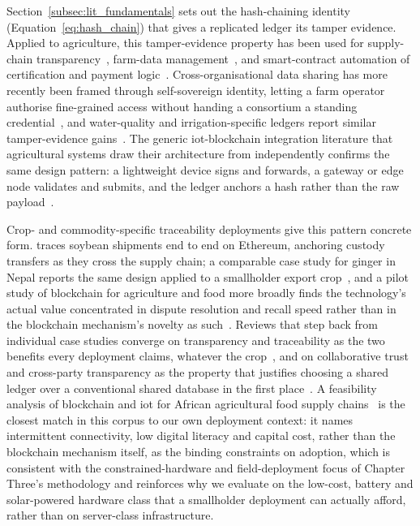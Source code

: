 \documentclass[12pt,a4paper,oneside]{book}
\begin{document}
Section~\ref{subsec:lit_fundamentals} sets out the hash-chaining identity
(Equation~\ref{eq:hash_chain}) that gives a replicated ledger its tamper
evidence. Applied to agriculture, this tamper-evidence property has been
used for supply-chain
transparency~\cite{tian2016agri, kamilaris2019rise, oh2025foodsafety, galvez2018future, tian2017traceability, reyna2018blockchain, tian2017agri, anonndsupplychain}, farm-data
management~\cite{lin2018blockchain, ferrag2020security, haque2024scalable, zhang2019blockchain, ali2023farmDataTampering}, and smart-contract
automation of certification and payment
logic~\cite{rama2021systematic, patil2022blockchain, nguyen2022smartFarmingSC, tian2017agri}. Cross-organisational data
sharing has more recently been framed through self-sovereign identity,
letting a farm operator authorise fine-grained access without handing a
consortium a standing credential~\cite{amraouy2025ssi}, and water-quality
and irrigation-specific ledgers report similar tamper-evidence
gains~\cite{saito2025blockchainWaterQuality, arshad2022blockchainBenefits, ali2023farmDataTampering, rahman2019agriSecurity}. The generic \gls{iot}-blockchain integration
literature that agricultural systems draw their architecture from
independently confirms the same design pattern: a lightweight device signs
and forwards, a gateway or edge node validates and submits, and the ledger
anchors a hash rather than the raw
payload~\cite{dorri2017blockchain, nguyen2019blockchain, xu2020making, reyna2018blockchain, benedict2021decentralized}.

Crop- and commodity-specific traceability deployments give this pattern
concrete form. \textcite{salah2019blockchain} traces soybean shipments end
to end on Ethereum, anchoring custody transfers as they cross the supply
chain; a comparable case study for ginger in Nepal reports the same
design applied to a smallholder export
crop~\cite{anonndblockchainbased}, and a pilot study of blockchain for
agriculture and food more broadly finds the technology's actual value
concentrated in dispute resolution and recall speed rather than in the
blockchain mechanism's novelty as such~\cite{liu2021traceableSupply}.
Reviews that step back from individual case studies converge on
transparency and traceability as the two benefits every deployment claims,
whatever the crop~\cite{anonndblockchaintechnology2}, and on collaborative
trust and cross-party transparency as the property that justifies choosing
a shared ledger over a conventional shared database in the first
place~\cite{kumar2024collaborativenetworks}. A feasibility analysis of
blockchain and \gls{iot} for African agricultural food supply
chains~\cite{tang2024feasibility} is the closest match in this corpus to
our own deployment context: it names intermittent connectivity, low
digital literacy and capital cost, rather than the blockchain mechanism
itself, as the binding constraints on adoption, which is consistent with
the constrained-hardware and field-deployment focus of Chapter Three's
methodology and reinforces why we evaluate on the low-cost, battery and
solar-powered hardware class that a smallholder deployment can actually
afford, rather than on server-class infrastructure.
\end{document}

